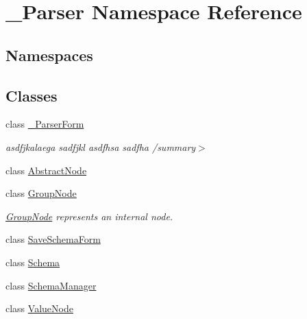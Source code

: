 \hypertarget{namespace__1920_parser}{}\section{\+\_\+Parser Namespace Reference}
\label{namespace__1920_parser}
\subsection*{Namespaces}
\begin{DoxyCompactItemize}
\end{DoxyCompactItemize}
\subsection*{Classes}
\begin{DoxyCompactItemize}
\item 
class \hyperlink{class__1920_parser_1_1__1920_parser_form}{\+\_\+Parser\+Form}
\begin{DoxyCompactList}\small\item\em asdfjkalaega sadfjkl asdfhsa sadfha /summary$>$ \end{DoxyCompactList}\item 
class \hyperlink{class__1920_parser_1_1_abstract_node}{Abstract\+Node}
\item 
class \hyperlink{class__1920_parser_1_1_group_node}{Group\+Node}
\begin{DoxyCompactList}\small\item\em \hyperlink{class__1920_parser_1_1_group_node}{Group\+Node} represents an internal node. \end{DoxyCompactList}\item 
class \hyperlink{class__1920_parser_1_1_save_schema_form}{Save\+Schema\+Form}
\item 
class \hyperlink{class__1920_parser_1_1_schema}{Schema}
\item 
class \hyperlink{class__1920_parser_1_1_schema_manager}{Schema\+Manager}
\item 
class \hyperlink{class__1920_parser_1_1_value_node}{Value\+Node}
\end{DoxyCompactItemize}
